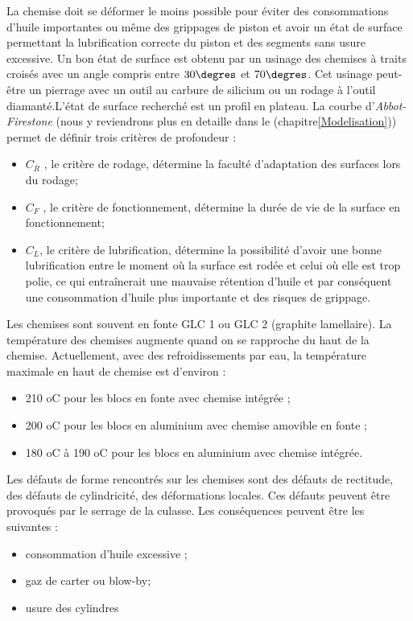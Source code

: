 La chemise doit se déformer le moins possible pour éviter des consommations d’huile importantes ou même des grippages de piston et avoir un état de surface permettant la lubrification correcte du piston et des segments sans usure excessive. Un bon état de surface est obtenu par un usinage des chemises à traits croisés avec un angle compris entre $30\degres$ et $70\degres$.\cite{Amal} Cet usinage peut-être un pierrage avec un outil au carbure de silicium ou un rodage à l’outil diamanté.L’état de surface recherché est un profil en plateau. La courbe d’\emph{Abbot-Firestone} (nous y reviendrons plus en detaille dans le (chapitre\ref{Modelisation}))  permet de définir trois critères de profondeur :
\begin{itemize}
	\item $C_{R}$ , le critère de rodage, détermine la faculté d’adaptation des surfaces lors du rodage;
	\item $C_{F}$ , le critère de fonctionnement, détermine la durée de vie de la surface en fonctionnement;
	\item $C_{L}$, le critère de lubrification, détermine la possibilité d’avoir
	une bonne lubrification entre le moment où la surface est rodée et celui où elle est trop polie, ce qui entraînerait une mauvaise rétention d’huile et par conséquent une consommation d’huile plus importante et des risques de grippage.
\end{itemize} 
Les chemises sont souvent en fonte GLC 1 ou GLC 2 (graphite lamellaire). La température des chemises augmente quand on se rapproche du haut de la chemise.\cite{tecauto} Actuellement, avec des refroidissements par eau, la température
maximale en haut de chemise est d’environ :
\begin{itemize}
	\item 210 oC pour les blocs en fonte avec chemise intégrée ;
	\item 200 oC pour les blocs en aluminium avec chemise amovible en fonte ;
	\item 180 oC à 190 oC pour les blocs en aluminium avec chemise intégrée.
\end{itemize}
Les défauts de forme rencontrés sur les chemises sont des défauts de rectitude, des défauts de cylindricité, des déformations locales. Ces défauts peuvent être provoqués par le serrage de la culasse.\cite{tecauto}
Les conséquences peuvent être les suivantes :
\begin{itemize}
	\item consommation d’huile excessive ;
	\item gaz de carter ou blow-by;
	\item usure des cylindres
\end{itemize}
